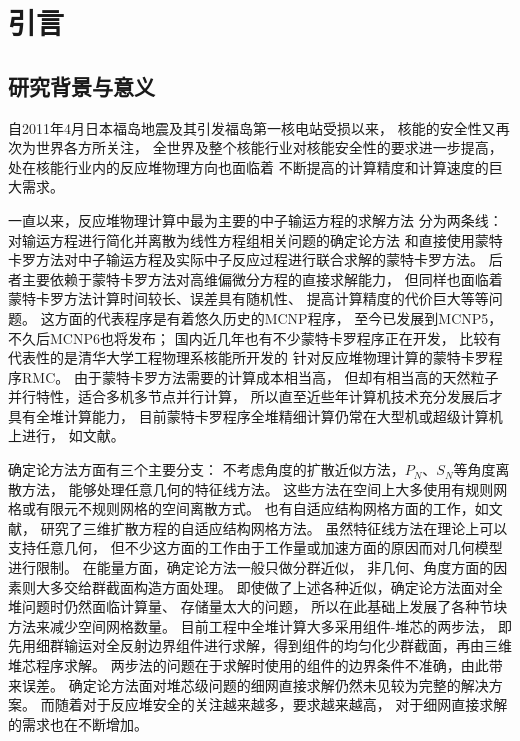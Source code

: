 
\chapter{引言}
\section{研究背景与意义}

自2011年4月日本福岛地震及其引发福岛第一核电站受损以来，
核能的安全性又再次为世界各方所关注，
全世界及整个核能行业对核能安全性的要求进一步提高，
处在核能行业内的反应堆物理方向也面临着
不断提高的计算精度和计算速度的巨大需求。

一直以来，反应堆物理计算中最为主要的中子输运方程的求解方法
分为两条线：对输运方程进行简化并离散为线性方程组相关问题的确定论方法
和直接使用蒙特卡罗方法对中子输运方程及实际中子反应过程进行联合求解的蒙特卡罗方法。
后者主要依赖于蒙特卡罗方法对高维偏微分方程的直接求解能力，
但同样也面临着蒙特卡罗方法计算时间较长、误差具有随机性、
提高计算精度的代价巨大等等问题。
这方面的代表程序是有着悠久历史的MCNP程序\cite{forster2004mcnp}，
至今已发展到MCNP5，不久后MCNP6也将发布；
国内近几年也有不少蒙特卡罗程序正在开发，
比较有代表性的是清华大学工程物理系核能所开发的
针对反应堆物理计算的蒙特卡罗程序RMC\cite{li2010development}。
由于蒙特卡罗方法需要的计算成本相当高，
但却有相当高的天然粒子并行特性，适合多机多节点并行计算，
所以直至近些年计算机技术充分发展后才具有全堆计算能力，
目前蒙特卡罗程序全堆精细计算仍常在大型机或超级计算机上进行，
如文献。

确定论方法方面有三个主要分支：
不考虑角度的扩散近似方法，$P_N$、$S_N$等角度离散方法，
能够处理任意几何的特征线方法。
这些方法在空间上大多使用有规则网格或有限元不规则网格的空间离散方式。
也有自适应结构网格方面的工作，如文献，
研究了三维扩散方程的自适应结构网格方法。
虽然特征线方法在理论上可以支持任意几何，
但不少这方面的工作由于工作量或加速方面的原因而对几何模型进行限制。
在能量方面，确定论方法一般只做分群近似，
非几何、角度方面的因素则大多交给群截面构造方面处理。
即使做了上述各种近似，确定论方法面对全堆问题时仍然面临计算量、
存储量太大的问题，\cite{azmy1997multiprocessing}
所以在此基础上发展了各种节块方法来减少空间网格数量。
目前工程中全堆计算大多采用组件-堆芯的两步法，
即先用细群输运对全反射边界组件进行求解，得到组件的均匀化少群截面，再由三维堆芯程序求解。
两步法的问题在于求解时使用的组件的边界条件不准确，由此带来误差。
确定论方法面对堆芯级问题的细网直接求解仍然未见较为完整的解决方案。
而随着对于反应堆安全的关注越来越多，要求越来越高，
对于细网直接求解的需求也在不断增加。

